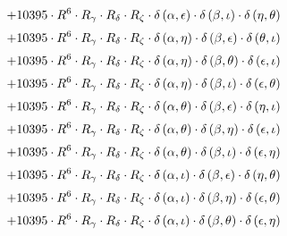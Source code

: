 \begin{subequations}
\begin{gather}
 \\[0.2em] \notag 		 + 10395 \cdot R^{6} \cdot R_{\gamma{}} \cdot R_{\delta{}} \cdot R_{\zeta{}} \cdot \delta{}\left(\alpha{}, \epsilon{}\right) \cdot \delta{}\left(\beta{}, \iota{}\right) \cdot \delta{}\left(\eta{}, \theta{}\right) 
 \\[0.2em] \notag 		 + 10395 \cdot R^{6} \cdot R_{\gamma{}} \cdot R_{\delta{}} \cdot R_{\zeta{}} \cdot \delta{}\left(\alpha{}, \eta{}\right) \cdot \delta{}\left(\beta{}, \epsilon{}\right) \cdot \delta{}\left(\theta{}, \iota{}\right) 
 \\[0.2em] \notag 		 + 10395 \cdot R^{6} \cdot R_{\gamma{}} \cdot R_{\delta{}} \cdot R_{\zeta{}} \cdot \delta{}\left(\alpha{}, \eta{}\right) \cdot \delta{}\left(\beta{}, \theta{}\right) \cdot \delta{}\left(\epsilon{}, \iota{}\right) 
 \\[0.2em] \notag 		 + 10395 \cdot R^{6} \cdot R_{\gamma{}} \cdot R_{\delta{}} \cdot R_{\zeta{}} \cdot \delta{}\left(\alpha{}, \eta{}\right) \cdot \delta{}\left(\beta{}, \iota{}\right) \cdot \delta{}\left(\epsilon{}, \theta{}\right) 
 \\[0.2em] \notag 		 + 10395 \cdot R^{6} \cdot R_{\gamma{}} \cdot R_{\delta{}} \cdot R_{\zeta{}} \cdot \delta{}\left(\alpha{}, \theta{}\right) \cdot \delta{}\left(\beta{}, \epsilon{}\right) \cdot \delta{}\left(\eta{}, \iota{}\right) 
 \\[0.2em] \notag 		 + 10395 \cdot R^{6} \cdot R_{\gamma{}} \cdot R_{\delta{}} \cdot R_{\zeta{}} \cdot \delta{}\left(\alpha{}, \theta{}\right) \cdot \delta{}\left(\beta{}, \eta{}\right) \cdot \delta{}\left(\epsilon{}, \iota{}\right) 
 \\[0.2em] \notag 		 + 10395 \cdot R^{6} \cdot R_{\gamma{}} \cdot R_{\delta{}} \cdot R_{\zeta{}} \cdot \delta{}\left(\alpha{}, \theta{}\right) \cdot \delta{}\left(\beta{}, \iota{}\right) \cdot \delta{}\left(\epsilon{}, \eta{}\right) 
 \\[0.2em] \notag 		 + 10395 \cdot R^{6} \cdot R_{\gamma{}} \cdot R_{\delta{}} \cdot R_{\zeta{}} \cdot \delta{}\left(\alpha{}, \iota{}\right) \cdot \delta{}\left(\beta{}, \epsilon{}\right) \cdot \delta{}\left(\eta{}, \theta{}\right) 
 \\[0.2em] \notag 		 + 10395 \cdot R^{6} \cdot R_{\gamma{}} \cdot R_{\delta{}} \cdot R_{\zeta{}} \cdot \delta{}\left(\alpha{}, \iota{}\right) \cdot \delta{}\left(\beta{}, \eta{}\right) \cdot \delta{}\left(\epsilon{}, \theta{}\right) 
 \\[0.2em] \notag 		 + 10395 \cdot R^{6} \cdot R_{\gamma{}} \cdot R_{\delta{}} \cdot R_{\zeta{}} \cdot \delta{}\left(\alpha{}, \iota{}\right) \cdot \delta{}\left(\beta{}, \theta{}\right) \cdot \delta{}\left(\epsilon{}, \eta{}\right) 

\end{gather}
\end{subequations}
